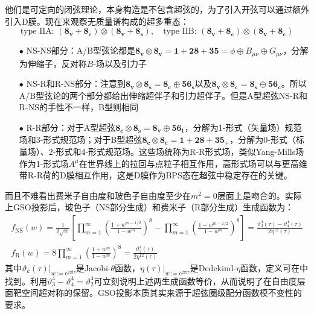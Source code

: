 他们是可定向的闭弦理论，本身构造是不包含超弦的，为了引入开弦可以通过额外引入D膜。现在来观察无质量谱构成的超多重态：
\begin{equation}
	\text{type IIA: }(\mathbf{8_v}+\mathbf{8_c})\otimes(\mathbf{8_v}+\mathbf{8_s}),\quad \text{type IIB: }(\mathbf{8_v}+\mathbf{8_c})\otimes(\mathbf{8_v}+\mathbf{8_c})
\end{equation}
\begin{itemize}
	\item[$\bullet$]NS-NS部分：A/B型弦论都是$\mathbf{8_v}\otimes\mathbf{8_v}=\mathbf{1}+\mathbf{28}+\mathbf{35}=\phi\oplus B_{\mu\nu}\oplus G_{\mu\nu}$，分解为伸缩子，反对称$B$-场以及引力子
	\item[$\bullet$]NS-R和R-NS部分：注意到$\mathbf{8_v}\otimes\mathbf{8_s}=\mathbf{8_c}\oplus\mathbf{56_s}$以及$\mathbf{8_v}\otimes\mathbf{8_c}=\mathbf{8_s}\oplus\mathbf{56_c}$。所以A/B型弦论的两个部分都给出伸缩超伴子和引力超伴子。但是A型超弦NS-R和R-NS的手性不一样，B型则相同
	\item[$\bullet$]R-R部分：对于A型超弦$\mathbf{8_c}\otimes\mathbf{8_s}=\mathbf{8_v}\oplus\mathbf{56_t}$，分解为1-形式（矢量场）规范场和3-形式规范场；对于B型超弦$\mathbf{8_c}\otimes\mathbf{8_c}=\mathbf{1}+\mathbf{2}\mathbf{8}+\mathbf{3}\mathbf{5_+}$，分解为0-形式（标量场）、2-形式和4-形式规范场。这些场统称为R-R形式场，类似Yang-Mills场作为1-形式场$A^\mu$在世界线上的拉回与点粒子相互作用，高形式场可以与更高维带R-R荷的D膜相互作用，这是D膜作为BPS态在超弦中稳定存在的关键。
\end{itemize}
而且不难看出费米子自由度和玻色子自由度至少在$m^2=0$层面上是吻合的。实际上GSO投影后，玻色子（NS部分生成）和费米子（R部分生成）生成函数为：
\begin{equation}
	\begin{gathered}
		f_{\mathrm{NS}}(w)=\frac{1}{2\sqrt{w}}\left[\prod_{m=1}^{\infty}\left(\frac{1+w^{m-1/2}}{1-w^m}\right)^8-\prod_{m=1}^{\infty}\left(\frac{1-w^{m-1/2}}{1-w^m}\right)^8\right]=\frac{\vartheta_3^4(\tau)-\vartheta_4^4(\tau)}{2\eta^{12}(\tau)}\\
	f_{\mathrm{R}}(w)=8\prod_{m=1}^\infty\left(\frac{1+w^m}{1-w^m}\right)^8=\frac{\vartheta_2^4(\tau)}{2\eta^{12}(\tau)}
	\end{gathered}
\end{equation}
其中$\vartheta_k(\tau)|_{w:=\mathrm{e}^{2\pi\mathrm{i}\tau}}$是Jacobi-$\theta$函数，$\eta(\tau)|_{w:=\mathrm{e}^{2\pi\mathrm{i}\tau}}$是Dedekind-$\eta$函数，定义可在\cite{Blumenhagen:2013fgp}中找到。利用$\vartheta^4_3-\vartheta^4_4=\vartheta^4_2$\cite{wzx,Hirschhorn2017}可立刻说明上述两生成函数等价，从而说明了在自由度层面靶空间超对称的保留。GSO投影本质其实来源于超弦圈级配分函数模不变性的要求。\cite{Polchinski:1998rr,Green:2012pqa,Blumenhagen:2013fgp}

